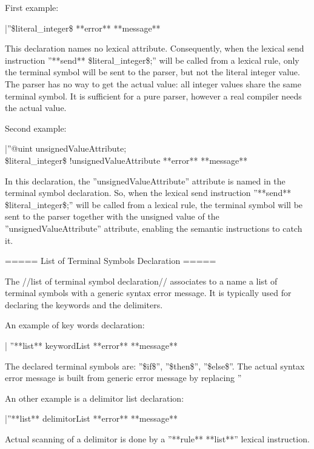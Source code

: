 First example:

|''\$literal\_integer\$ **error** **message** %

This declaration names no lexical attribute. Consequently, when the lexical send instruction ''**send** \$literal\_integer\$;'' will be called from a lexical rule, only the terminal symbol will be sent to the parser, but not the literal integer value. The parser has no way to get the actual value: all integer values share the same terminal symbol. It is sufficient for a pure parser, however a real compiler needs the actual value.

Second example:

|''@uint unsignedValueAttribute;\\ 
\$literal\_integer\$ !unsignedValueAttribute **error** **message** %

In this declaration, the ''unsignedValueAttribute'' attribute is named in the terminal symbol declaration. So, when the lexical send instruction ''**send** \$literal\_integer\$;'' will be called from a lexical rule, the terminal symbol will be sent to the parser together with the unsigned value of the ''unsignedValueAttribute'' attribute, enabling the semantic instructions to catch it.

===== List of Terminal Symbols Declaration =====

The //list of terminal symbol declaration// associates to a name a list of terminal symbols with a generic syntax error message. It is typically used for declaring the keywords and the delimiters.

An example of key words declaration:

| ''**list** keywordList **error** **message** %

The declared terminal symbols are: ''\$if\$'', ''\$then\$'', ''\$else\$''. The actual syntax error message is built from generic error message by replacing ''%

An other example is a delimitor list declaration:

|''**list** delimitorList **error** **message** %

Actual scanning of a delimitor is done by a ''**rule** **list**'' lexical instruction.

